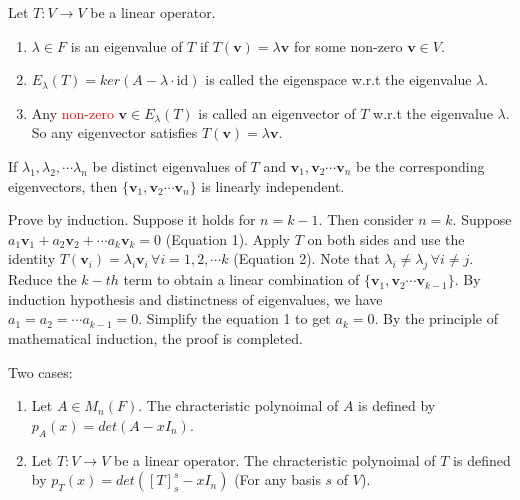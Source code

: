 \documentclass[12pt]{article}
\begin{document}
\begin{definition}
    Let $T:V\rightarrow V$ be a linear operator.
    \begin{enumerate}
        \item $\lambda\in F$ is an eigenvalue of $T$ if $T(\mathbf{v})=\lambda\mathbf{v}$ for some non-zero $\mathbf{v}\in V$.
        \item $E_\lambda(T)=ker(A-\lambda\cdot \text{id})$ is called the eigenspace w.r.t the eigenvalue $\lambda$.
        \item Any \textcolor{red}{non-zero} $\mathbf{v}\in E_\lambda(T)$ is called an eigenvector of $T$ w.r.t the eigenvalue $\lambda$. So any eigenvector satisfies $T(\mathbf{v})=\lambda\mathbf{v}$.
    \end{enumerate}
\end{definition}

\begin{theorem}
    If $\lambda_1, \lambda_2,\cdots\lambda_n$ be distinct eigenvalues of $T$ and $\mathbf{v}_1,\mathbf{v}_2\cdots\mathbf{v}_n$ be the corresponding eigenvectors,
    then $\{\mathbf{v}_1,\mathbf{v}_2\cdots\mathbf{v}_n\}$ is linearly independent.
\end{theorem}

\begin{tcolorbox}[boxrule=0.5pt]
\begin{pf}
    Prove by induction.
    Suppose it holds for $n=k-1$. Then consider $n=k$.
    Suppose $a_1\mathbf{v}_1 + a_2\mathbf{v}_2 + \cdots a_k\mathbf{v}_k = 0$ (Equation 1).
    Apply $T$ on both sides and use the identity $T(\mathbf{v}_i)=\lambda_i\mathbf{v}_i\,\forall i=1,2,\cdots k$ (Equation 2).
    Note that $\lambda_i\neq\lambda_j\,\forall i\neq j$.
    Reduce the $k-th$ term to obtain a linear combination of $\{\mathbf{v}_1,\mathbf{v}_2\cdots\mathbf{v}_{k-1}\}$. 
    By induction hypothesis and distinctness of eigenvalues, we have $a_1=a_2=\cdots a_{k-1}=0$. Simplify the equation 1 to get $a_k=0$.
    By the principle of mathematical induction, the proof is completed.
\end{pf}
\end{tcolorbox}


\begin{definition}
    Two cases:
    \begin{enumerate}
        \item Let $A\in M_n(F)$. The chracteristic polynoimal of $A$ is defined by $p_A(x)=det(A-x I_n)$.
        \item Let $T:V\rightarrow V$ be a linear operator. The chracteristic polynoimal of $T$ is defined by $p_T(x)=det([T]^{s}_{s} -x I_n)$ (For any basis $s$ of $V$).
    \end{enumerate}
\end{definition}
\end{document}
